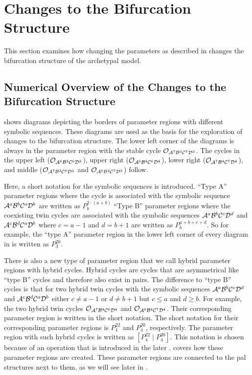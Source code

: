 \section{Changes to the Bifurcation Structure}
\label{sec:add.change}

This section examines how changing the parameters as described in  changes the bifurcation structure of the archetypal model.

\subsection{Numerical Overview of the Changes to the Bifurcation Structure}
\label{sec:add.change.num}

 shows diagrams depicting the borders of parameter regions with different symbolic sequences.
These diagrams are used as the basis for the exploration of changes to the bifurcation structure.
The lower left corner of the diagrams is always in the parameter region with the stable cycle $\mathcal{O}_{\mathcal{A}^7\mathcal{B}^3\mathcal{C}^7\mathcal{D}^3}$.
The cycles in the upper left ($\mathcal{O}_{\mathcal{A}^6\mathcal{B}^3\mathcal{C}^6\mathcal{D}^3}$), upper right ($\mathcal{O}_{\mathcal{A}^6\mathcal{B}^4\mathcal{C}^6\mathcal{D}^4}$), lower right ($\mathcal{O}_{\mathcal{A}^7\mathcal{B}^4\mathcal{C}^7\mathcal{D}^4}$), and middle ($\mathcal{O}_{\mathcal{A}^7\mathcal{B}^3\mathcal{C}^6\mathcal{D}^4}$ and $\mathcal{O}_{\mathcal{A}^6\mathcal{B}^4\mathcal{C}^7\mathcal{D}^3}$) follow.

Here, a short notation for the symbolic sequences is introduced.
``Type A'' parameter regions where the cycle is associated with the symbolic sequence $\mathcal{A}^a\mathcal{B}^b\mathcal{C}^a\mathcal{D}^b$ are written as $P^{2 \cdot \left(a + b\right)}_b$
``Type B'' parameter regions where the coexisting twin cycles are associated with the symbolic sequences $\mathcal{A}^a\mathcal{B}^b\mathcal{C}^c\mathcal{D}^d$ and $\mathcal{A}^c\mathcal{B}^d\mathcal{C}^a\mathcal{D}^b$ where $c = a - 1$ and $d = b + 1$ are written as $P^{a + b + c + d}_b$.
So for example, the ``type A'' parameter region in the lower left corner of every diagram in  is written as $P^{20}_3$.

There is also a new type of parameter region that we call hybrid parameter regions with hybrid cycles.
Hybrid cycles are cycles that are asymmetrical like ``type B'' cycles and therefore also exist in pairs.
The difference to ``type B'' cycles is that for two hybrid twin cycles with the symbolic sequences $\mathcal{A}^a\mathcal{B}^b\mathcal{C}^c\mathcal{D}^d$ and $\mathcal{A}^c\mathcal{B}^d\mathcal{C}^a\mathcal{D}^b$ either $c \neq a - 1$ or $d \neq b + 1$ but $c \leq a$ and $d \geq b$.
For example, the two hybrid twin cycles $\mathcal{O}_{\mathcal{A}^7\mathcal{B}^4\mathcal{C}^6\mathcal{D}^4}$ and $\mathcal{O}_{\mathcal{A}^6\mathcal{B}^4\mathcal{C}^7\mathcal{D}^4}$.
Their corresponding parameter region is written  in the short notation.
The short notation for their corresponding parameter regions is $P^{22}_4$ and $P^{20}_4$, respectively.
The parameter region with such hybrid cycles is written as $\left[P^{22}_4 \mid P^{20}_4\right]$.
This notation is chosen because of an operation that is introduced in the later .
 covers how these parameter regions are created.
These parameter regions are connected to the \gls{pal} structures next to them, as we will see later in .


